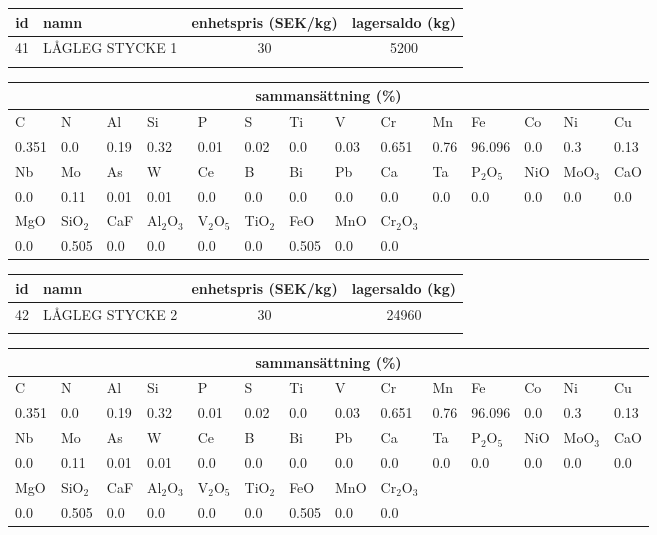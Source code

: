 \begin{center}
{\scriptsize\addtolength{\tabcolsep}{-3pt}
\begin{tabular}{clcc}
id&namn&enhetspris (SEK/kg)&lagersaldo (kg)\\
\hline
41&LÅGLEG STYCKE 1&30&5200\\\\
\end{tabular}
\begin{tabular}{llllllllllllll}
\multicolumn{14}{c}{sammansättning (\%)}\\
\hline
C&N&Al&Si&P&S&Ti&V&Cr&Mn&Fe&Co&Ni&Cu\\
\hline
0.351&0.0&0.19&0.32& 0.01&0.02&0.0&0.03& 0.651&0.76&96.096&0.0& 0.3&0.13\\
\hline
Nb&Mo&As&W&Ce&B&Bi&Pb&Ca&Ta&P$_2$O$_5$&NiO&MoO$_3$&CaO\\
\hline
0.0& 0.11& 0.01& 0.01& 0.0& 0.0& 0.0& 0.0& 0.0& 0.0& 0.0& 0.0& 0.0& 0.0\\
\hline
MgO&SiO$_2$&CaF&Al$_2$O$_3$&V$_2$O$_5$&TiO$_2$&FeO&MnO&Cr$_2$O$_3$\\
\hline
0.0& 0.505& 0.0& 0.0& 0.0& 0.0& 0.505& 0.0& 0.0\\
\end{tabular}
}
\end{center}

\begin{center}
{\scriptsize\addtolength{\tabcolsep}{-3pt}
\begin{tabular}{clcc}
id&namn&enhetspris (SEK/kg)&lagersaldo (kg)\\
\hline
42&LÅGLEG STYCKE 2&30&24960\\\\
\end{tabular}
\begin{tabular}{llllllllllllll}
\multicolumn{14}{c}{sammansättning (\%)}\\
\hline
C&N&Al&Si&P&S&Ti&V&Cr&Mn&Fe&Co&Ni&Cu\\
\hline
0.351&0.0&0.19&0.32& 0.01&0.02&0.0&0.03& 0.651&0.76&96.096&0.0& 0.3&0.13\\
\hline
Nb&Mo&As&W&Ce&B&Bi&Pb&Ca&Ta&P$_2$O$_5$&NiO&MoO$_3$&CaO\\
\hline
0.0& 0.11& 0.01& 0.01& 0.0& 0.0& 0.0& 0.0& 0.0& 0.0& 0.0& 0.0& 0.0& 0.0\\
\hline
MgO&SiO$_2$&CaF&Al$_2$O$_3$&V$_2$O$_5$&TiO$_2$&FeO&MnO&Cr$_2$O$_3$\\
\hline
0.0& 0.505& 0.0& 0.0& 0.0& 0.0& 0.505& 0.0& 0.0\\
\end{tabular}
}
\end{center}

